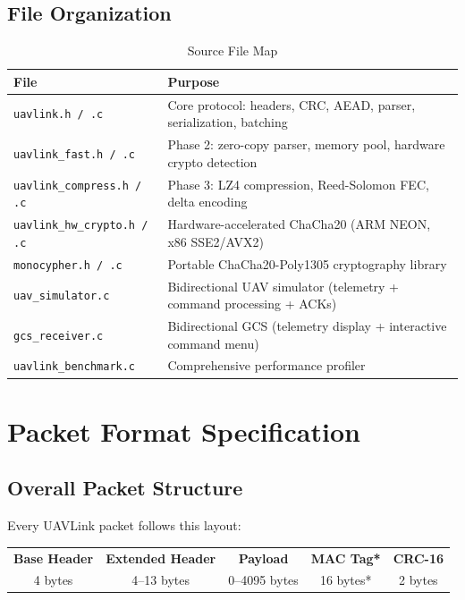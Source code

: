 \documentclass[11pt,a4paper]{article}
\begin{document}
\subsection{File Organization}

\begin{table}[H]
\centering
\caption{Source File Map}
\begin{tabularx}{\textwidth}{@{}lX@{}}
\toprule
\textbf{File} & \textbf{Purpose} \\
\midrule
\texttt{uavlink.h / .c}           & Core protocol: headers, CRC, AEAD, parser, serialization, batching \\
\texttt{uavlink\_fast.h / .c}     & Phase 2: zero-copy parser, memory pool, hardware crypto detection \\
\texttt{uavlink\_compress.h / .c} & Phase 3: LZ4 compression, Reed-Solomon FEC, delta encoding \\
\texttt{uavlink\_hw\_crypto.h / .c} & Hardware-accelerated ChaCha20 (ARM NEON, x86 SSE2/AVX2) \\
\texttt{monocypher.h / .c}        & Portable ChaCha20-Poly1305 cryptography library \\
\texttt{uav\_simulator.c}         & Bidirectional UAV simulator (telemetry + command processing + ACKs) \\
\texttt{gcs\_receiver.c}          & Bidirectional GCS (telemetry display + interactive command menu) \\
\texttt{uavlink\_benchmark.c}     & Comprehensive performance profiler \\
\bottomrule
\end{tabularx}
\end{table}

\section{Packet Format Specification}

\subsection{Overall Packet Structure}

Every UAVLink packet follows this layout:

\begin{center}
\begin{tabular}{|c|c|c|c|c|}
\hline
\textbf{Base Header} & \textbf{Extended Header} & \textbf{Payload} & \textbf{MAC Tag*} & \textbf{CRC-16} \\
4 bytes & 4--13 bytes & 0--4095 bytes & 16 bytes* & 2 bytes \\
\hline
\end{tabular}
\end{center}
\end{document}
